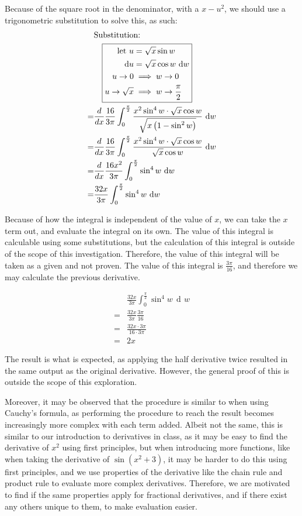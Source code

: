 \documentclass{article}
\DeclareMathOperator{\di}{\,d\!}
\newcommand{\IntSub}[1]{
{\textup{Substitution:}} \\
&\quad
\boxed{\begin{aligned}
		#1
\end{aligned}}
}
\begin{document}
Because of the square root in the denominator, with a $x-u^2$, we should use a trigonometric
substitution to solve this, as such:
\begin{align*}
	 &\IntSub{
		 \text{let } u &= \sqrt{x}\sin{w} \\
		 \di u &= \sqrt{x}\cos{w} \di w \\
		 u \to 0 &\implies w \to 0 \\
		 u \to \sqrt{x} &\implies w \to \frac{\pi}{2} \\
	 } \\
	=&\frac{d}{dx}\frac{16}{3\pi} \int_0^{\frac{\pi}{2}} \frac{x^2\sin^4w\cdot \sqrt{x}\cos{w}}{\sqrt{x\left(1-\sin^2w\right)}} \di w \\
	=&\frac{d}{dx}\frac{16}{3\pi} \int_0^{\frac{\pi}{2}} \frac{x^2\sin^4w\cdot \sqrt{x}\cos{w}}{\sqrt{x}\cos w} \di w \\
	=&\frac{d}{dx}\frac{16x^2}{3\pi} \int_0^{\frac{\pi}{2}} \sin^4w \di w \\
	=&\frac{32x}{3\pi} \int_0^{\frac{\pi}{2}} \sin^4w \di w \\
\end{align*}

Because of how the integral is independent of the value of $x$, we can take the
$x$ term out, and evaluate the integral on its own. The value of this integral
is calculable using some substitutions, but the calculation of this integral is
outside of the scope of this investigation. Therefore, the value of this
integral will be taken as a given and not proven. The value of this integral is
$\frac{3\pi}{16}$, and therefore we may calculate the previous derivative.

\begin{align*}
	&\frac{32x}{3\pi} \int_0^{\frac{\pi}{2}} \sin^4w \di w \\
	=&\frac{32x}{3\pi} \frac{3\pi}{16} \\
	=&\frac{32x\cdot3\pi}{16\cdot 3\pi} \\
	=&2x
\end{align*}

The result is what is expected, as applying the half derivative twice resulted
in the same output as the original derivative. However, the general proof of
this is outside the scope of this exploration.

Moreover, it may be observed that the procedure is similar to when using
Cauchy's formula, as performing the procedure to reach the result becomes
increasingly more complex with each term added. Albeit not the same, this is
similar to our introduction to derivatives in class, as it may be easy to find
the derivative of $x^2$ using first principles, but when introducing more
functions, like when taking the derivative of $\sin{\left(x^2+3\right)}$, it
may be harder to do this using first principles, and we use properties of the
derivative like the chain rule and product rule to evaluate more complex
derivatives. Therefore, we are motivated to find if the same properties apply
for fractional derivatives, and if there exist any others unique to them, to
make evaluation easier.
\end{document}

